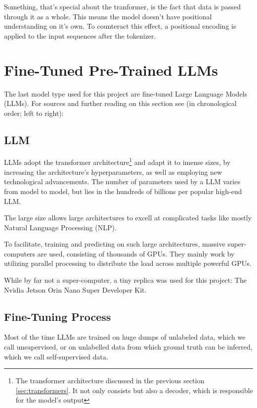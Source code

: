 \documentclass{article}
\begin{document}
Something, that's special about the tranformer, is the fact that data is passed 
through it as a whole. This means the model doesn't have positional understanding 
on it's own. To counteract this effect, a positional encoding is applied to the 
input sequences after the tokenizer.

\newpage
\section{Fine-Tuned Pre-Trained LLMs}

The last model type used for this project are fine-tuned Large 
Language Models (LLMs).
For sources and further reading on this section see (in chronological order; 
left to right): \cite{geeksforgeeks_2024,Stryker_LLM,srinivasan2024transformer,Bergmann_Fine_Tuning}


\subsection{LLM}

LLMs adopt the transformer architecture\footnote{The transformer architecture 
discussed in the previous section \ref{sec:transformers}. It not only consists 
but also a decoder, which is responsible for the model's output} and adapt it 
to imense sizes, by increasing the architecture's hyperparameters, as well as 
employing new technological advancements. The number of parameters used by a 
LLM varies from model to model, but lies in the hundreds of billions per 
popular high-end LLM.

The large size allows large architectures to excell at complicated tasks like 
mostly Natural Language Processing (NLP).

To facilitate, training and predicting on such large architectures, massive super-
computers are used, consisting of thousands of GPUs. They mainly work by utilizing 
parallel processing to distribute the load across multiple powerful GPUs. 

While by far not a super-computer, a tiny replica was used for this project: 
The Nvidia Jetson Orin Nano Super Developer Kit.


\subsection{Fine-Tuning Process}

Most of the time LLMs are trained on huge dumps of unlabeled data, which 
we call unsupervised, or on unlabelled data from which ground truth can be 
inferred, which we call self-supervised data. 
\end{document}
